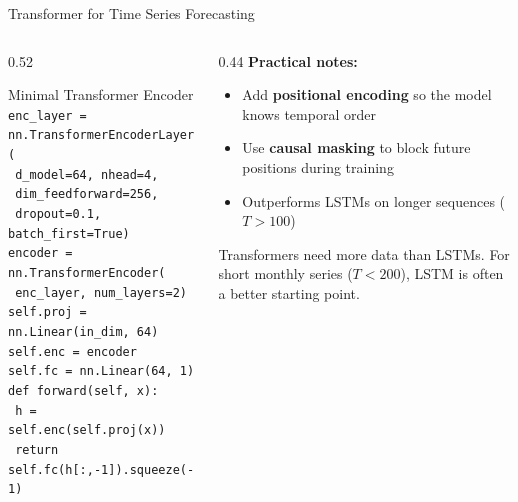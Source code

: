 \documentclass[aspectratio=169, 11pt]{beamer}
\begin{document}
\begin{frame}{Transformer for Time Series Forecasting}
  \begin{columns}[T]
    \begin{column}{0.52\textwidth}
      \begin{examplebox}{Minimal Transformer Encoder}
        {\scriptsize
        \texttt{enc\_layer = nn.TransformerEncoderLayer(}\\
        \texttt{  d\_model=64, nhead=4,}\\
        \texttt{  dim\_feedforward=256,}\\
        \texttt{  dropout=0.1, batch\_first=True)}\\
        \texttt{encoder = nn.TransformerEncoder(}\\
        \texttt{  enc\_layer, num\_layers=2)}\\
        \texttt{self.proj = nn.Linear(in\_dim, 64)}\\
        \texttt{self.enc  = encoder}\\
        \texttt{self.fc   = nn.Linear(64, 1)}\\
        \texttt{def forward(self, x):}\\
        \texttt{  h = self.enc(self.proj(x))}\\
        \texttt{  return self.fc(h[:,-1]).squeeze(-1)}
        }
      \end{examplebox}
    \end{column}
    \begin{column}{0.44\textwidth}
      \textbf{Practical notes:}
      \begin{itemize}\footnotesize\itemsep0pt
        \item Add \textbf{positional encoding} so the model knows temporal order
        \item Use \textbf{causal masking} to block future positions during training
        \item Outperforms LSTMs on longer sequences ($T > 100$)
      \end{itemize}
      \begin{warningbox}
        \footnotesize Transformers need more data than LSTMs.
        For short monthly series ($T < 200$),
        LSTM is often a better starting point.
      \end{warningbox}
    \end{column}
  \end{columns}
\end{frame}
\end{document}
